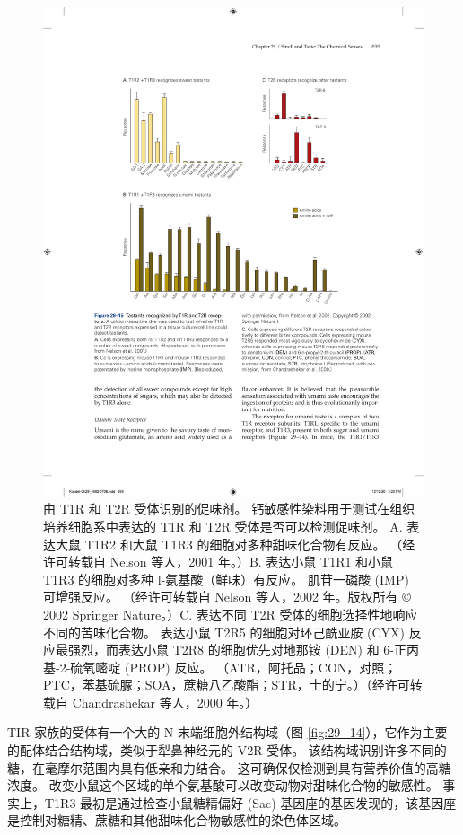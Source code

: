 \begin{figure}[htbp]
	\centering
	\includegraphics[width=0.8\linewidth]{chap29/fig_29_15}
	\caption{由 T1R 和 T2R 受体识别的促味剂。 钙敏感性染料用于测试在组织培养细胞系中表达的 T1R 和 T2R 受体是否可以检测促味剂。 A. 表达大鼠 T1R2 和大鼠 T1R3 的细胞对多种甜味化合物有反应。 （经许可转载自 Nelson 等人，2001 年。）B. 表达小鼠 T1R1 和小鼠 T1R3 的细胞对多种 l-氨基酸（鲜味）有反应。 肌苷一磷酸 (IMP) 可增强反应。 （经许可转载自 Nelson 等人，2002 年。版权所有 © 2002 Springer Nature。）C. 表达不同 T2R 受体的细胞选择性地响应不同的苦味化合物。 表达小鼠 T2R5 的细胞对环己酰亚胺 (CYX) 反应最强烈，而表达小鼠 T2R8 的细胞优先对地那铵 (DEN) 和 6-正丙基-2-硫氧嘧啶 (PROP) 反应。 （ATR，阿托品；CON，对照；PTC，苯基硫脲；SOA，蔗糖八乙酸酯；STR，士的宁。）（经许可转载自 Chandrashekar 等人，2000 年。）}
	\label{fig:29_15}
\end{figure}

TIR 家族的受体有一个大的 N 末端细胞外结构域（图 \ref{fig:29_14}），它作为主要的配体结合结构域，类似于犁鼻神经元的 V2R 受体。 该结构域识别许多不同的糖，在毫摩尔范围内具有低亲和力结合。 这可确保仅检测到具有营养价值的高糖浓度。 改变小鼠这个区域的单个氨基酸可以改变动物对甜味化合物的敏感性。 事实上，T1R3 最初是通过检查小鼠糖精偏好 (Sac) 基因座的基因发现的，该基因座是控制对糖精、蔗糖和其他甜味化合物敏感性的染色体区域。

